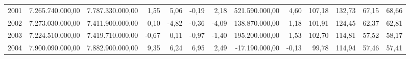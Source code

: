 \documentclass[a4paper,openright,12pt]{book}
\begin{document}
\begin{table}
{\begin{tabular}{lrrrrrrrrrrrr}
    2001 & 7.265.740.000,00                     & 7.787.330.000,00                     & 1,55                                          & 5,06                                          & -0,19                                      & 2,18                                       & 521.590.000,00        & 4,60                     & 107,18                 & 132,73                & 67,15                                 & 68,66                  \\
    2002 & 7.273.030.000,00                     & 7.411.900.000,00                     & 0,10                                          & -4,82                                         & -0,36                                      & -4,09                                      & 138.870.000,00        & 1,18                     & 101,91                 & 124,45                & 62,37                                 & 62,81                  \\
    2003 & 7.224.510.000,00                     & 7.419.710.000,00                     & -0,67                                         & 0,11                                          & -0,97                                      & -1,40                                      & 195.200.000,00        & 1,53                     & 102,70                 & 114,81                & 57,52                                 & 58,17                  \\
    2004 & 7.900.090.000,00                     & 7.882.900.000,00                     & 9,35                                          & 6,24                                          & 6,95                                       & 2,49                                       & -17.190.000,00        & -0,13                    & 99,78                  & 114,94                & 57,46                                 & 57,41                  \\


\end{tabular}}
\end{table}
\end{document}
